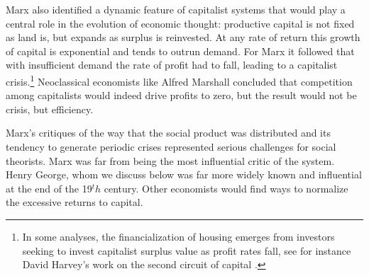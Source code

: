 
Marx also identified a dynamic feature of capitalist systems that would play a central role in the evolution of economic thought: productive capital is not fixed as land is, but expands as surplus is reinvested. At any rate of return this growth of capital is exponential and tends to outrun demand. %
For Marx it followed that with insufficient demand the rate of profit had to fall, leading to a capitalist crisis.\footnote{In some analyses, the financialization of housing emerges from investors seeking to invest capitalist surplus value as profit rates fall, see for instance David Harvey's work on \gls{the second circuit of capital} \cite{GET_david_harvey}.}  Neoclassical economists like Alfred Marshall concluded that competition among capitalists  would indeed drive profits to zero, but the result would not be crisis, but efficiency. 


Marx's critiques of the way that the social product was distributed and its tendency to generate periodic crises represented serious challenges for social theorists. 
Marx was far from being the most influential critic of the system. Henry George, whom we discuss below was far  more widely known and influential at the end of the 19$^th$ century. Other economists  would find ways to normalize the  excessive returns to capital.



